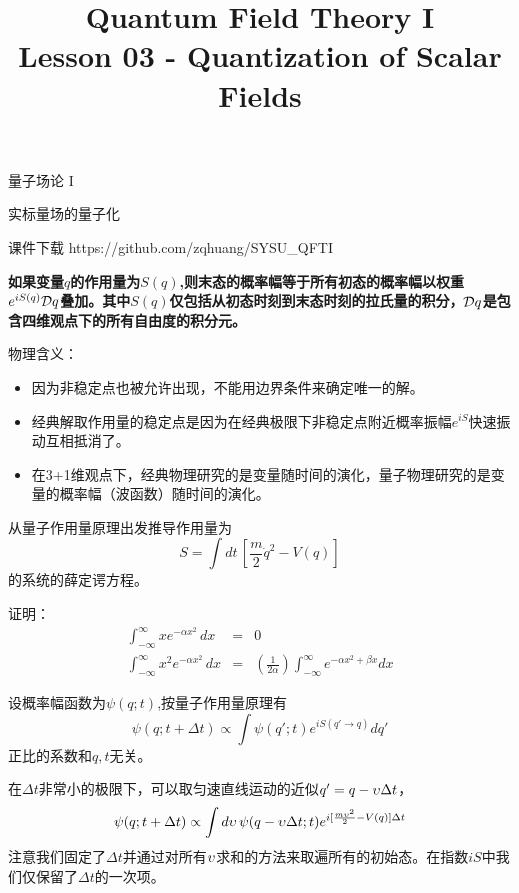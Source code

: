 \documentclass[CJK]{beamer}
\title{Quantum Field Theory I \\ Lesson 03 - Quantization of Scalar Fields}
\author{}
\date{}
\begin{document}
\begin{frame}
 
\begin{center}
\begin{Large}
\bch
量子场论 I 

{\vskip 0.3in}

实标量场的量子化

\ech
\end{Large}
\end{center}

\vskip 0.2in

\bch
课件下载
\ech
https://github.com/zqhuang/SYSU\_QFTI

\end{frame}



\begin{frame}
\bch
{\bf 如果变量$q$的作用量为$S(q)$,则末态的概率幅等于所有初态的概率幅以权重$e^{iS(q)}\mathcal{D} q$叠加。其中$S(q)$仅包括从初态时刻到末态时刻的拉氏量的积分，$\mathcal{D} q$是包含四维观点下的所有自由度的积分元。}

\skipline
物理含义：
\begin{itemize}
\item{因为非稳定点也被允许出现，不能用边界条件来确定唯一的解。}
\item{经典解取作用量的稳定点是因为在经典极限下非稳定点附近概率振幅$e^{iS}$快速振动互相抵消了。}
\item{在3+1维观点下，经典物理研究的是变量随时间的演化，量子物理研究的是变量的概率幅（波函数）随时间的演化。}
\end{itemize}
\ech
\end{frame}


\begin{frame}
\bch
从量子作用量原理出发推导作用量为
$$S = \int dt\,  \left[\frac{m}{2}\dot q^2 - V(q)\right]$$
的系统的薛定谔方程。
\ech
\end{frame}

\begin{frame}
\bch
证明：
\begin{eqnarray}
\int_{-\infty}^{\infty} x e^{-\alpha x^2 }\, dx &=& 0 \\
\int_{-\infty}^{\infty} x^2 e^{-\alpha x^2 }\, dx &=& \left(\frac{1}{2\alpha}\right) \int_{-\infty}^{\infty} e^{-\alpha x^2 + \beta x} dx 
\end{eqnarray}
\ech
\end{frame}

\begin{frame}
\bch
设概率幅函数为$\psi(q;t)$,按量子作用量原理有 
$$ \psi(q; t+\Delta t) \propto \int \psi(q';t) e^{iS(q'\rightarrow q)}dq'$$
正比的系数和$q,t$无关。
\skipline

在$\Delta t$非常小的极限下，可以取匀速直线运动的近似$q' = q - \upsilon \Delta t$，
$$ \psi(q; t+\Delta t) \propto \int d\upsilon\, \psi(q-\upsilon \Delta t; t) e^{i[\frac{m\upsilon^2}{2} - V(q)]\Delta t}$$
注意我们固定了$\Delta t$并通过对所有$\upsilon$求和的方法来取遍所有的初始态。在指数$iS$中我们仅保留了$\Delta t$的一次项。
\ech
\end{frame}
\end{document}
